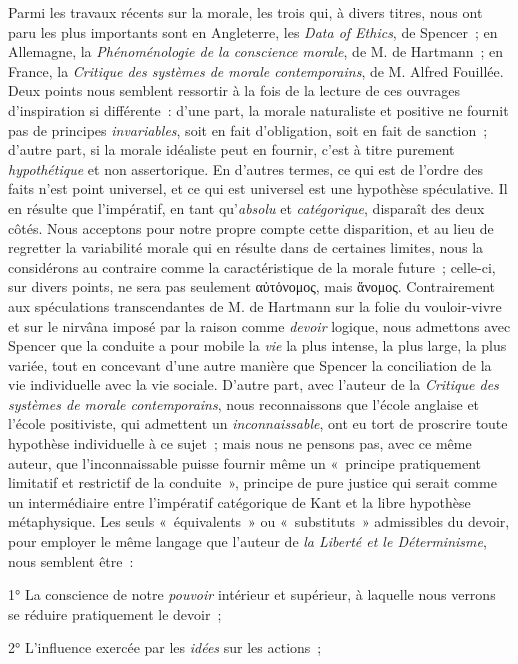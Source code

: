 \documentclass[french,twoside]{book} %
\begin{document}
Parmi les travaux récents sur la morale, les trois qui, à divers titres, nous ont paru les plus importants sont en Angleterre, les \emph{Data of Ethics}, de Spencer ; en Allemagne, la \emph{Phénoménologie de la conscience morale}, de M. de Hartmann ; en France, la \emph{Critique des systèmes de morale contemporains}, de M. Alfred Fouillée. Deux points nous semblent ressortir à la fois de la lecture de ces ouvrages d’inspiration si différente : d’une part, la morale naturaliste et positive ne fournit pas de principes \emph{invariables}, soit en fait d’obligation, soit en fait de sanction ; d’autre part, si la morale idéaliste peut en fournir, c’est à titre purement \emph{hypothétique} et non assertorique. En d’autres termes, ce qui est de l’ordre des faits n’est point universel, et ce qui est universel est une hypothèse spéculative. Il en résulte que l’impératif, en tant qu’\emph{absolu} et \emph{catégorique}, disparaît des deux côtés. Nous acceptons pour notre propre compte cette disparition, et au lieu de regretter la variabilité morale qui en résulte dans de certaines limites, nous la considérons au contraire comme la caractéristique de la morale future ; celle-ci, sur divers points, ne sera pas seulement αὐτὁνομος, mais ἅνομος. Contrairement aux spéculations transcendantes de M. de Hartmann sur la folie du vouloir-vivre et sur le nirvâna imposé par la raison comme \emph{devoir} logique, nous admettons avec Spencer que la conduite a pour mobile la \emph{vie} la plus intense, la plus large, la plus variée, tout en concevant d’une autre manière que Spencer la conciliation de la vie individuelle avec la vie sociale. D’autre part, avec l’auteur de la \emph{Critique des systèmes de morale contemporains}, nous reconnaissons que l’école anglaise et l’école positiviste, qui admettent un \emph{inconnaissable}, ont eu tort de proscrire toute hypothèse individuelle à ce sujet ; mais nous ne pensons pas, avec ce même auteur, que l’inconnaissable puisse fournir même un « principe pratiquement limitatif et restrictif de la conduite », principe de pure justice qui serait comme un intermédiaire entre l’impératif catégorique de Kant et la libre hypothèse métaphysique. Les seuls « équivalents » ou « substituts » admissibles du devoir, pour employer le même langage que l’auteur de \emph{la Liberté et le Déterminisme}, nous semblent être :\par
1° La conscience de notre \emph{pouvoir} intérieur et supérieur, à laquelle nous verrons se réduire pratiquement le devoir ;\par
2° L’influence exercée par les \emph{idées} sur les actions ;\par
\end{document}
